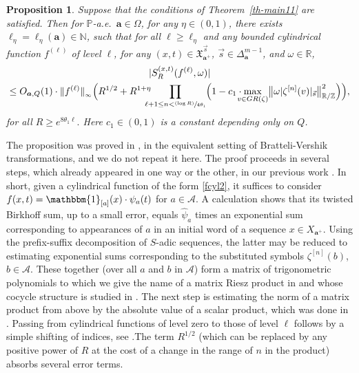 \documentclass[10pt]{amsart}
\let\mathcal\mathscr
\newcommand{\One}{\mathbbm{1}}
\newcommand{\psfrac}[2]{\sfrac{(#1)}{#2}}
\theoremstyle{plain}
\newtheorem{prop}[theorem]{Proposition}
\theoremstyle{definition}
\newcommand\bom{{\boldsymbol a}}\let\ba\bom
\let\om\omega
\let\Om\Omega
\newcommand\Xx{\mathfrak{X}}
\newcommand\Ak{\mathcal{A}}
\newcommand{\R}{\mathbb{R}}
\newcommand{\Z}{\mathbb{Z}}
\newcommand{\N}{\mathbb{N}}
\renewcommand{\P}{\mathbb{P}}
\begin{document}
\begin{prop} \label{prop-Dioph4} Suppose that the conditions of Theorem~\ref{th-main11} are satisfied. Then
for $\P$-a.e.\ $\bom\in \Om$,
for any $\eta\in (0,1)$, there exists $\ell_\eta=\ell_\eta(\bom)\in \N$, such that
for all $\ell\ge \ell_\eta$ and any bounded cylindrical function $f^{(\ell)}$ of level $\ell$,
for any $(x,t)\in \Xx_{\bom^+}^{\vec{s}}$, $\vec s\in \Delta_\bom^{m-1}$, and $\om\in \R$,
\begin{multline}
\label{eq-Dioph3}
|S^{(x,t)}_R(f^{(\ell)},\om)|\\
\le O_{\bom,Q}(1)\cdot \|f^{(\ell)}\|_{_\infty} \Bigl(R^{1/2}+ R^{1+\eta}\!\!\!\!\!\prod_{\ell+1\le n < \psfrac{\log R}{4\theta_1}}
\Bigl( 1 - c_1\cdot \!\!\!\! \max_{v\in GR(\zeta)}\bigl\| \om|\zeta^{[n]}(v)|_{\vec{s}}\bigr\|^2_{\R/\Z}\Bigr)\Bigr),
\end{multline}
for all
$
R\ge e^{8\theta_1 \ell}.
$
Here $c_1\in (0,1)$ is a constant depending only on $Q$.
\end{prop}

The proposition was proved in \cite[Prop.\,7.1]{BuSo18a}, in the equivalent setting of Bratteli-Vershik transformations, and we do not repeat it here. The proof proceeds in several steps, which already appeared in one way or the other, in our previous work \cite{BuSol2,BuSo18a,BuSo19}.
In short, given a cylindrical function of the form \eqref{fcyl2}, it suffices to consider $f(x,t)=\One_{[a]}(x) \cdot \psi_a(t)$ for $a\in \Ak$. A calculation shows that its twisted Birkhoff sum, up to a small error, equals $\widehat{\psi}_a$ times an exponential sum corresponding to appearances of $a$ in an initial word of a sequence $x\in X_{\bom^+}$. Using the prefix-suffix decomposition of $S$-adic sequences, the latter may be reduced to estimating exponential sums corresponding to the substituted symbols $\zeta^{[n]}(b)$, $b\in \Ak$. These together (over all $a$ and $b$ in $\Ak$) form a matrix of trigonometric polynomials to which we give the name of a matrix Riesz product in
\cite[\S3.2]{BuSo18a} and whose cocycle structure is studied in \cite{BuSo19}. The next step is estimating the norm of a matrix product from above by the absolute value of a scalar product, which was done in \cite[Prop.\,3.4]{BuSo18a}. Passing from cylindrical functions of level zero to those of level $\ell$ follows by a simple shifting of indices, see \cite[\S3.5]{BuSo18a}.The term $R^{1/2}$ (which can be replaced by any positive power of $R$ at the cost of a change in the range of $n$ in the product) absorbs several error terms.
\end{document}
